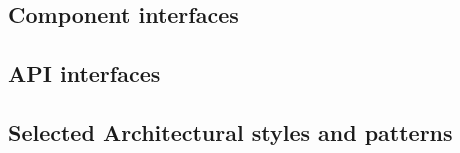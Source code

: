 \subsection{Component interfaces}


\subsection{API interfaces}




\subsection{Selected Architectural styles and patterns}
 \label{cleanArchiref}
